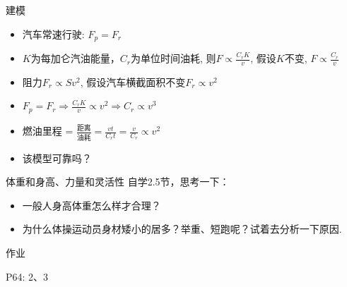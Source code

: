 \documentclass[mathserif]{beamer}
\begin{document}
\begin{frame}{建模}

  \begin{itemize}
  \item 汽车常速行驶: $F_p = F_r$
  \item $K$为每加仑汽油能量，$C_r$为单位时间油耗, 则$F \propto \frac{C_rK}{v}$, 假设$K$不变, $F \propto \frac{C_r}{v}$
  \item 阻力$F_r \propto Sv^2$, 假设汽车横截面积不变$F_r \propto v^2$
  \item $F_p = F_r \Rightarrow \frac{C_rK}{v} \propto v^2 \Rightarrow C_r \propto v^3$
  \item 燃油里程 = $\frac{\text{距离}}{\text{油耗}} = \frac{vt}{C_rt}=\frac{v}{C_r}\propto v^2$
  \item 该模型可靠吗？
  \end{itemize}
  
\end{frame}

\begin{frame}{体重和身高、力量和灵活性}
  自学2.5节，思考一下：

  \begin{itemize}
  \item 一般人身高体重怎么样才合理？
  \item 为什么体操运动员身材矮小的居多？举重、短跑呢？试着去分析一下原因.
  \end{itemize}

\end{frame}

\begin{frame}{作业}


  P64: 2、3

\end{frame}
\end{document}
